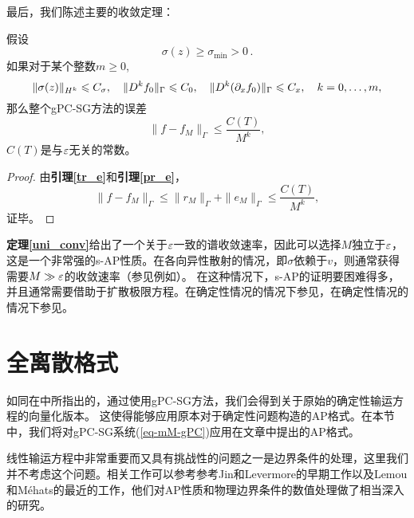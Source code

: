 最后，我们陈述主要的收敛定理：
\begin{thm}\label{uni_conv}
  假设
  \[
    \sigma(z)\ge\sigma_{\mathrm{min}}>0\,.
  \]
  如果对于某个整数$m\ge 0$,
  \begin{equation}
    \|\sigma(z)\|_{H^k}\leqslant C_\sigma, \quad \|D^k f_{0}\|_{\Gamma}\leqslant C_0, \quad \|D^k(\partial_x f_0)\|_{\Gamma} \leqslant C_x, \quad k=0,\dots,m,
  \end{equation}
  那么整个gPC-SG方法的误差
  \begin{equation}\label{err}
  \|f - f_M\|_{\Gamma}\le \frac{C(T)}{M^k},
  \end{equation}
  $C(T)$是与$\varepsilon$无关的常数。
\end{thm}
\begin{proof}
  由{\bf 引理\ref{tr_e}}和{\bf 引理\ref{pr_e}}，
  \begin{equation*}
    \|f - f_M\|_{\Gamma} \le \|r_M\|_{\Gamma} +  \|e_M\|_{\Gamma}\le \frac{C(T)}{M^k},
  \end{equation*}
  证毕。
\end{proof}

\begin{rem}
  {\bf 定理\ref{uni_conv}}给出了一个关于$\varepsilon$一致的谱收敛速率，因此可以选择$M$独立于$\varepsilon$，这是一个非常强的s-AP性质。在各向异性散射的情况，即$\sigma$依赖于$v$，则通常获得需要$ M\gg\varepsilon$的收敛速率（参见例如）。 在这种情况下，s-AP的证明要困难得多，并且通常需要借助于扩散极限方程。在确定性情况的情况下参见，在确定性情况的情况下参见。
\end{rem}      


\section{全离散格式}\label{sec:full}
如同在中所指出的，通过使用gPC-SG方法，我们会得到关于原始的确定性输运方程的向量化版本。 这使得能够应用原本对于确定性问题构造的AP格式。在本节中，我们将对gPC-SG系统(\ref{eq-mM-gPC})应用在文章中提出的AP格式。

线性输运方程中非常重要而又具有挑战性的问题之一是边界条件的处理，这里我们并不考虑这个问题。相关工作可以参考参考Jin和Levermore的早期工作以及Lemou和M\'ehats的最近的工作，他们对AP性质和物理边界条件的数值处理做了相当深入的研究。

